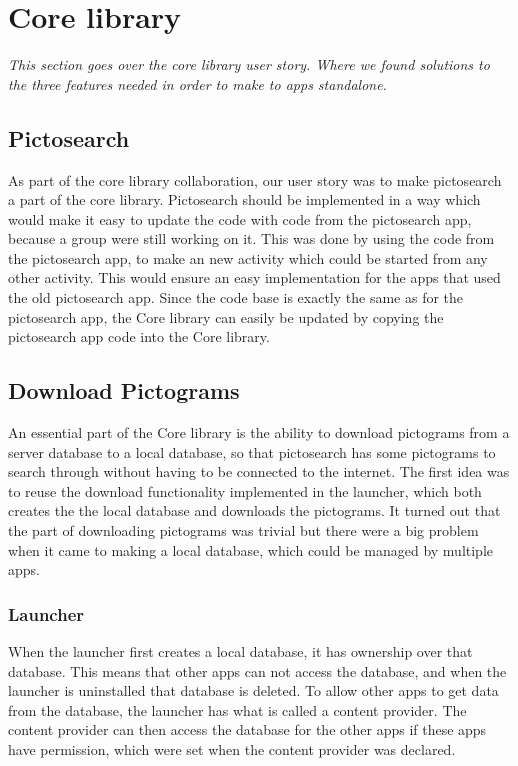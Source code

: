 \section{Core library}

\textit{This section goes over the core library user story. Where we found solutions to the three features needed in order to make to apps standalone.}

\subsection{Pictosearch}
As part of the core library collaboration, our user story was to make pictosearch a part of the core library. Pictosearch should be implemented in a way which would make it easy to update the code with code from the pictosearch app, because a group were still working on it. This was done by using the code from the pictosearch app, to make an new activity which could be started from any other activity. This would ensure an easy implementation for the apps that used the old pictosearch app. Since the code base is exactly the same as for the pictosearch app, the Core library can easily be updated by copying the pictosearch app code into the Core library.

\subsection{Download Pictograms}
An essential part of the Core library is the ability to download pictograms from a server database to a local database, so that pictosearch has some pictograms to search through without having to be connected to the internet. The first idea was to reuse the download functionality implemented in the launcher, which both creates the the local database and downloads the pictograms. It turned out that the part of downloading pictograms was trivial but there were a big problem when it came to making a local database, which could be managed by multiple apps.

\subsubsection{Launcher}
When the launcher first creates a local database, it has ownership over that database. This means that other apps can not access the database, and when the launcher is uninstalled that database is deleted. To allow other apps to get data from the database, the launcher has what is called a content provider. The content provider can then access the database for the other apps if these apps have permission, which were set when the content provider was declared.

